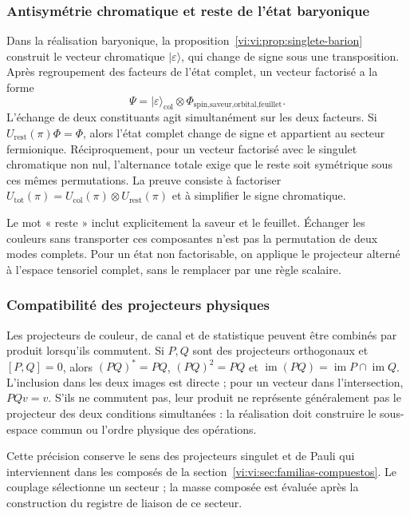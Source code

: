 \subsubsection{Antisymétrie chromatique et reste de l’état baryonique}

Dans la réalisation baryonique, la
proposition~\ref{vi:vi:prop:singlete-barion} construit le vecteur
chromatique \(|\varepsilon\rangle\), qui change de signe
sous une transposition. Après regroupement des facteurs de l’état
complet, un vecteur factorisé a la forme
\[
 \Psi=|\varepsilon\rangle_{\mathrm{col}}
 \otimes\Phi_{\text{spin,saveur,orbital,feuillet}}.
\]
L’échange de deux constituants agit simultanément
sur les deux facteurs. Si \(U_{\mathrm{rest}}(\pi)\Phi=\Phi\),
alors l’état complet change de signe et appartient au
secteur fermionique. Réciproquement, pour un vecteur factorisé
avec le singulet chromatique non nul, l’alternance totale exige
que le reste soit symétrique sous ces mêmes permutations.
La preuve consiste à factoriser
\(U_{\mathrm{tot}}(\pi)=U_{\mathrm{col}}(\pi)\otimes
U_{\mathrm{rest}}(\pi)\) et à simplifier le signe chromatique.

Le mot « reste » inclut explicitement la saveur et le feuillet.
Échanger les couleurs sans transporter ces composantes n’est pas
la permutation de deux modes complets. Pour un état non
factorisable, on applique le projecteur alterné à l’espace
tensoriel complet, sans le remplacer par une règle scalaire.

\subsubsection{Compatibilité des projecteurs physiques}

Les projecteurs de couleur, de canal et de statistique peuvent être combinés
par produit lorsqu’ils commutent. Si \(P,Q\) sont des projecteurs
orthogonaux et \([P,Q]=0\), alors
\((PQ)^*=PQ\), \((PQ)^2=PQ\) et
\(\operatorname{im}(PQ)=\operatorname{im}P\cap\operatorname{im}Q\).
L’inclusion dans les deux images est directe ; pour un vecteur
dans l’intersection, \(PQv=v\). S’ils ne commutent pas, leur produit
ne représente généralement pas le projecteur des deux conditions
simultanées : la réalisation doit construire le sous-espace
commun ou l’ordre physique des opérations.

Cette précision conserve le sens des projecteurs
singulet et de Pauli qui interviennent dans les composés de la
section~\ref{vi:vi:sec:familias-compuestos}. Le couplage
sélectionne un secteur ; la masse composée est évaluée après
la construction du registre de liaison de ce secteur.

